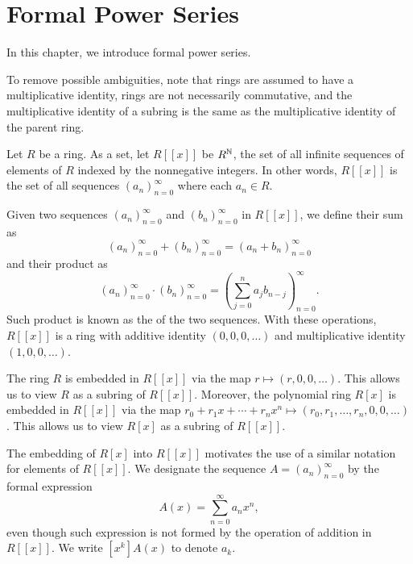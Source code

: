 \chapter{Formal Power Series}

In this chapter, we introduce formal power series.

To remove possible ambiguities,
note that
rings are assumed to have a multiplicative identity,
rings are not necessarily commutative, and
the multiplicative identity of a subring is the same as the multiplicative identity of the parent ring.

Let \(R\) be a ring.
As a set, let \(R[[x]]\) be \(R^{\mathbb{N}}\), the set of all infinite sequences of elements of \(R\) indexed by the nonnegative integers.
In other words, \(R[[x]]\) is the set of all sequences \((a_n)_{n=0}^\infty\) where each \(a_n \in R\).

Given two sequences \((a_n)_{n=0}^\infty\) and \((b_n)_{n=0}^\infty\) in \(R[[x]]\), we define their sum as
\begin{equation}
    (a_n)_{n=0}^\infty + (b_n)_{n=0}^\infty = (a_n + b_n)_{n=0}^\infty
\end{equation}
and their product as
\begin{equation}
    (a_n)_{n=0}^\infty \cdot (b_n)_{n=0}^\infty = \left( \sum_{j=0}^n a_j b_{n-j} \right)_{n=0}^\infty.
\end{equation}
Such product is known as the  of the two sequences.
With these operations, \(R[[x]]\) is a ring with additive identity \((0, 0, 0, \dots)\) and multiplicative identity \((1, 0, 0, \dots)\).

The ring \(R\) is embedded in \(R[[x]]\) via the map \(r \mapsto (r, 0, 0, \dots)\).
This allows us to view \(R\) as a subring of \(R[[x]]\).
Moreover, the polynomial ring \(R[x]\) is embedded in \(R[[x]]\) via the map \(r_0 + r_1 x + \cdots + r_n x^n \mapsto (r_0, r_1, \dots, r_n, 0, 0, \dots)\).
This allows us to view \(R[x]\) as a subring of \(R[[x]]\).

The embedding of \(R[x]\) into \(R[[x]]\) motivates the use of a similar notation for elements of \(R[[x]]\).
We designate the sequence \(A = (a_n)_{n=0}^\infty\) by the formal expression
\begin{equation*}
    A(x) = \sum_{n=0}^\infty a_n x^n,
\end{equation*}
even though such expression is not formed by the operation of addition in \(R[[x]]\).
We write \([x^k]A(x)\) to denote \(a_k\).


